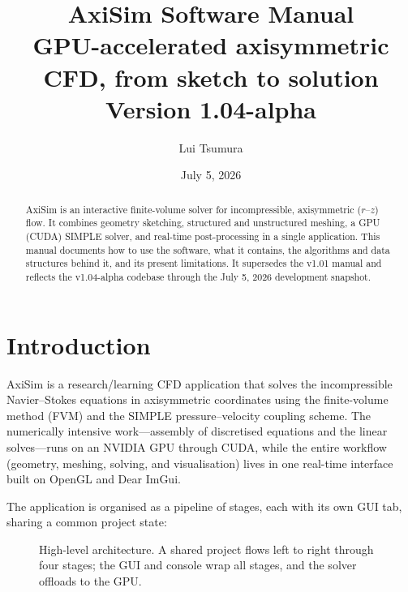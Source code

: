 \documentclass[11pt]{article}
\title{\textbf{AxiSim Software Manual} \\[2pt] \large GPU-accelerated axisymmetric CFD, from sketch to solution \\[6pt] \normalsize Version 1.04-alpha}
\author{Lui Tsumura}
\date{July 5, 2026}
\begin{document}
\maketitle

\begin{abstract}
\noindent AxiSim is an interactive finite-volume solver for incompressible, axisymmetric
(\(r\text{--}z\)) flow. It combines geometry sketching, structured and unstructured
meshing, a GPU (CUDA) SIMPLE solver, and real-time post-processing in a single
application. This manual documents how to use the software, what it contains, the
algorithms and data structures behind it, and its present limitations. It supersedes
the v1.01 manual and reflects the v1.04-alpha codebase through the July 5, 2026
development snapshot.
\end{abstract}

\tableofcontents
\newpage

\section{Introduction}
AxiSim is a research/learning CFD application that solves the incompressible
Navier--Stokes equations in axisymmetric coordinates using the finite-volume method
(FVM) and the SIMPLE pressure--velocity coupling scheme. The numerically intensive
work---assembly of discretised equations and the linear solves---runs on an NVIDIA GPU
through CUDA, while the entire workflow (geometry, meshing, solving, and visualisation)
lives in one real-time interface built on OpenGL and Dear ImGui.

The application is organised as a pipeline of stages, each with its own GUI tab, sharing
a common project state:

\begin{figure}[h]
\centering
{}
\caption{High-level architecture. A shared project flows left to right through four
stages; the GUI and console wrap all stages, and the solver offloads to the GPU.}
\label{fig:arch}
\end{figure}
\end{document}
